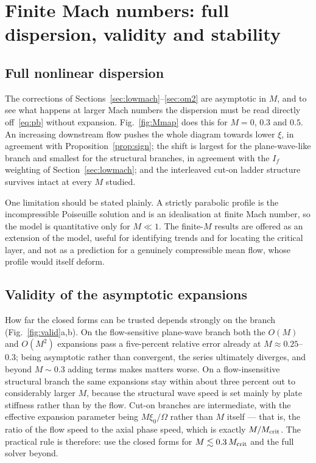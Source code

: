 \documentclass[11pt,a4paper]{article}
\newcommand{\Om}{\Omega}
\theoremstyle{plain}
\theoremstyle{remark}
\begin{document}
\section{Finite Mach numbers: full dispersion, validity and stability}\label{sec:largeM}

\subsection{Full nonlinear dispersion}
The corrections of Sections~\ref{sec:lowmach}--\ref{sec:om2} are asymptotic in $M$, and to see what
happens at larger Mach numbers the dispersion must be read directly off~\eqref{eq:pb} without
expansion. Fig.~\ref{fig:Mmap} does this for $M=0$, $0.3$ and $0.5$. An increasing downstream flow
pushes the whole diagram towards lower $\xi$, in agreement with Proposition~\ref{prop:sign}; the shift
is largest for the plane-wave-like branch and smallest for the structural branches, in agreement with
the $I_f$ weighting of Section~\ref{sec:lowmach}; and the interleaved cut-on ladder structure survives
intact at every $M$ studied.

One limitation should be stated plainly. A strictly parabolic profile is the incompressible Poiseuille
solution and is an idealisation at finite Mach number, so the model is quantitative only for $M\ll1$.
The finite-$M$ results are offered as an extension of the model, useful for identifying trends and for
locating the critical layer, and not as a prediction for a genuinely compressible mean flow, whose
profile would itself deform.

\subsection{Validity of the asymptotic expansions}
How far the closed forms can be trusted depends strongly on the branch
(Fig.~\ref{fig:valid}a,b). On the flow-sensitive plane-wave branch both the $O(M)$ and $O(M^2)$
expansions pass a five-percent relative error already at $M\approx0.25$--$0.3$; being asymptotic rather
than convergent, the series ultimately diverges, and beyond $M\sim0.3$ adding terms makes matters
worse. On a flow-insensitive structural branch the same expansions stay within about three percent out
to considerably larger $M$, because the structural wave speed is set mainly by plate stiffness rather
than by the flow. Cut-on branches are intermediate, with the effective expansion parameter being
$M\xi_0/\Om$ rather than $M$ itself --- that is, the ratio of the flow speed to the axial phase speed,
which is exactly $M/M_{\rm crit}$. The practical rule is therefore: use the closed forms for
$M\lesssim0.3\,M_{\rm crit}$ and the full solver beyond.
\end{document}
